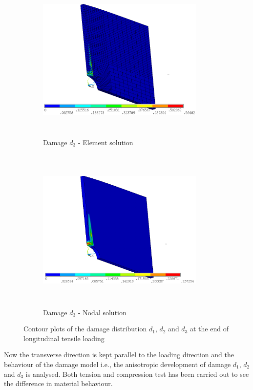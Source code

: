 \documentclass[a4paper,12pt,twoside]{report}
\begin{document}
\begin{figure}[htbp!]\ContinuedFloat     
     \begin{subfigure}[b]{0.4\textwidth}
         \includegraphics[width=8.3cm,height=8.2cm,keepaspectratio]{27.d3-lt-e.png}
         \caption{Damage $d_{3}$ - Element solution}
         \label{fig:d3-lt-e}
     \end{subfigure}
     \hspace{1.8cm}
     \begin{subfigure}[b]{0.4\textwidth}
         \includegraphics[width=8.3cm,height=8.2cm,keepaspectratio]{27.d3-lt-n.png}
         \caption{Damage $d_{3}$ - Nodal solution}
         \label{fig:d3-lt-n}
     \end{subfigure}
        \caption{Contour plots of the damage distribution $d_{1}$, $d_{2}$ and $d_{3}$ at the end of longitudinal tensile loading }
        \label{fig:Contour plots of the damage d1,d2,d3}     
\end{figure}
\FloatBarrier
Now the transverse direction is kept parallel to the loading direction and the behaviour of the damage model i.e., the anisotropic development of damage  $d_{1}$, $d_{2}$ and $d_{3}$ is analysed. Both tension and compression test has been carried out to see the difference in material behaviour.
\end{document}
